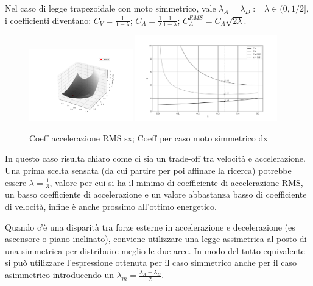 Nel caso di legge trapezoidale con moto simmetrico, vale \(\lambda_A=\lambda_D := \lambda \in (0,1/2]\), i coefficienti diventano: \(C_V = \frac{1}{1-\lambda}\); \(C_A = \frac{1}{\lambda}\frac{1}{1-\lambda}\); \(C_A^{RMS} = C_A \sqrt{2\lambda}\).

\begin{figure}[h]
    \centering
    \includegraphics[width=0.4\textwidth]{Immagini/CaRMS.png}
    \includegraphics[width=0.55\textwidth]{Immagini/CvCaCaRMS.png}
    \caption{Coeff accelerazione RMS sx; Coeff per caso moto simmetrico dx}
\end{figure}

In questo caso risulta chiaro come ci sia un trade-off tra velocità e accelerazione.
Una prima scelta sensata (da cui partire per poi affinare la ricerca) potrebbe essere \(\lambda = \frac{1}{3}\), valore per cui si ha il minimo di coefficiente di accelerazione RMS, un basso coefficiente di accelerazione e un valore abbastanza basso di coefficiente di velocità, infine è anche prossimo all'ottimo energetico.

Quando c'è una disparità tra forze esterne in accelerazione e decelerazione (es ascensore o piano inclinato), conviene utilizzare una legge assimetrica al posto di una simmetrica per distribuire meglio le due aree.
In modo del tutto equivalente si può utilizzare l'espressione ottenuta per il caso simmetrico anche per il caso asimmetrico introducendo un \(\lambda_m=\frac{\lambda_A+\lambda_B}{2}\).

